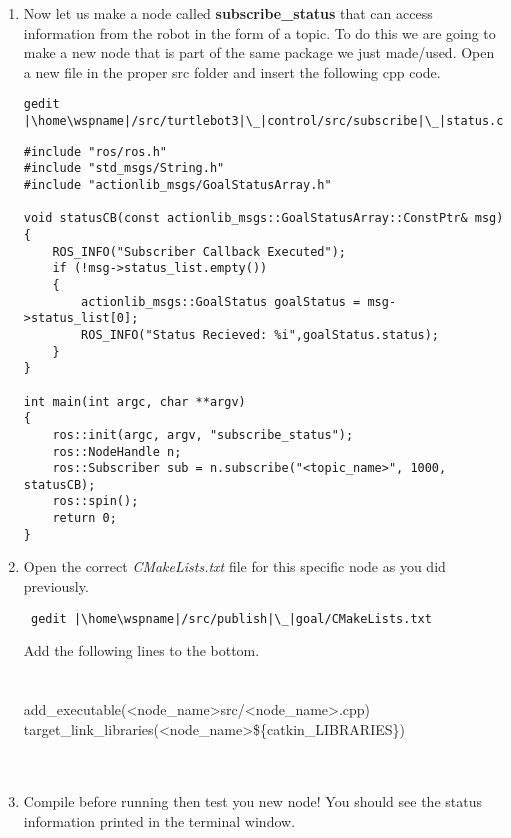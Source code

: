 \documentclass[12pt]{article}
\newcommand{\wspname}{<workspace\_name>}
\newcommand{\nodname}{<node\_name>}
\newcommand{\home}{\textasciitilde/}
\begin{document}
\begin{enumerate}
     \newpage
\item Now let us make a node called {\bf subscribe\_status} that can access information from the robot in the form of a topic. To do this we are going to make a new node that is part of the same package we just made/used. Open a new file in the proper src folder and insert the following cpp code.
\begin{verbatim}
gedit |\home\wspname|/src/turtlebot3|\_|control/src/subscribe|\_|status.cpp 
\end{verbatim}   

         \begin{lstlisting}
#include "ros/ros.h"
#include "std_msgs/String.h"
#include "actionlib_msgs/GoalStatusArray.h"

void statusCB(const actionlib_msgs::GoalStatusArray::ConstPtr& msg)
{
    ROS_INFO("Subscriber Callback Executed");
    if (!msg->status_list.empty())
    {
        actionlib_msgs::GoalStatus goalStatus = msg->status_list[0];
        ROS_INFO("Status Recieved: %i",goalStatus.status);  
    }
}

int main(int argc, char **argv)
{
    ros::init(argc, argv, "subscribe_status");
    ros::NodeHandle n;
    ros::Subscriber sub = n.subscribe("<topic_name>", 1000, statusCB);
    ros::spin();
    return 0;
}
    \end{lstlisting}
    
    \item Open the correct {\it CMakeLists.txt} file for this specific node as you did previously.

\begin{verbatim}
 gedit |\home\wspname|/src/publish|\_|goal/CMakeLists.txt 
\end{verbatim}

Add the following lines to the bottom.\\
 \underline{\hspace{155mm}}\\\\
 {\selectfont add\_executable(\nodname\hspace{3mm}src/\nodname.cpp) } \\
{\selectfont target\_link\_libraries(\nodname \hspace{3mm}\$\{catkin\_LIBRARIES\}) } \\
\underline{\hspace{155mm}}\\\\
 
    \item Compile before running then test you new node! You should see the status information printed in the terminal window.
    
\end{enumerate}
\end{document}

